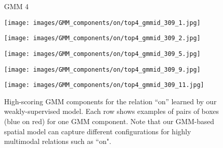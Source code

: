 \documentclass[10pt,twocolumn,letterpaper]{article}
\begin{document}
\begin{figure*}[t]
    \begin{minipage}[b]{0.005\textwidth}
    	\centering
    	\begin{turn}{90}
    GMM 4
    	\end{turn}
    	\vspace{1.5ex}
    \end{minipage}
    \hspace{0.01\textwidth}
    \begin{minipage}[b]{0.18\textwidth}
    	\centering
       	\texttt{[image: images/GMM\_components/on/top4\_gmmid\_309\_1.jpg]}
    \end{minipage}
    \hspace{0.005\textwidth}
    \begin{minipage}[b]{0.18\textwidth}
    	\centering
       	\texttt{[image: images/GMM\_components/on/top4\_gmmid\_309\_2.jpg]}
    \end{minipage}
    \hspace{0.005\textwidth}
    \begin{minipage}[b]{0.18\textwidth}
    	\centering
       	\texttt{[image: images/GMM\_components/on/top4\_gmmid\_309\_5.jpg]}
    \end{minipage}
    \hspace{0.005\textwidth}
	\begin{minipage}[b]{0.18\textwidth}
    	\centering
       	\texttt{[image: images/GMM\_components/on/top4\_gmmid\_309\_9.jpg]}
    \end{minipage}
    \hspace{0.005\textwidth}
    \begin{minipage}[b]{0.18\textwidth}
    	\centering
       	\texttt{[image: images/GMM\_components/on/top4\_gmmid\_309\_11.jpg]}
    \end{minipage}             
     
   \caption{%
      High-scoring GMM components for the relation ``on'' learned by our weakly-supervised model. Each row shows examples of pairs of boxes ({\color{blue}blue} on {\color{red}red}) for one GMM component. Note that our GMM-based spatial model can capture different configurations for highly multimodal relations such as ``on".} 
      \vspace{-.2cm}
    \label{fig:multimodal}
\end{figure*}
\end{document}
